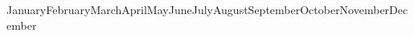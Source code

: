 \documentclass{book}
\newcommand{\monthYear}{%
\ifcase \month \or January\or February\or March\or April\or May\or June\or July\or August\or September\or October\or November\or December\fi \space \number \year}
\begin{document}
\monthYear
\end{document}
